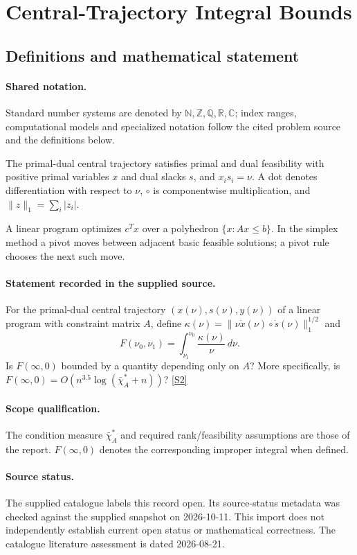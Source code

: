 \documentclass[11pt]{article}
\newcommand{\sref}[2]{\hyperlink{source:#1:#2}{[S#2]}}
\begin{document}
\section{Central-Trajectory Integral Bounds}\label{statement}

\subsection{Definitions and mathematical statement}

\paragraph{Shared notation.}Standard number systems are denoted by $\mathbb N,\mathbb Z,\mathbb Q,\mathbb R,\mathbb C$; index ranges, computational models and specialized notation follow the cited problem source and the definitions below.


The primal-dual central trajectory satisfies primal and dual feasibility with positive primal variables $x$ and dual slacks $s$, and $x_i s_i=\nu$. A dot denotes differentiation with respect to $\nu$, $\circ$ is componentwise multiplication, and $\lVert z\rVert_1=\sum_i|z_i|$.

A linear program optimizes $c^Tx$ over a polyhedron $\{x:Ax\leq b\}$. In the simplex method a pivot moves between adjacent basic feasible solutions; a pivot rule chooses the next such move.
\paragraph{Statement recorded in the supplied source.}
For the primal-dual central trajectory $(x(\nu),s(\nu),y(\nu))$ of a linear program with constraint matrix $A$, define $\kappa(\nu)=\lVert\nu\dot x(\nu)\circ\dot s(\nu)\rVert_1^{1/2}$ and $$F(\nu_0,\nu_1)=\int_{\nu_1}^{\nu_0}\frac{\kappa(\nu)}{\nu}\,d\nu.$$ Is $F(\infty,0)$ bounded by a quantity depending only on $A$? More specifically, is $F(\infty,0)=O\!\left(n^{3.5}\log(\bar\chi_A^*+n)\right)$? \sref{statement}{2}
\paragraph{Scope qualification.}
The condition measure $\bar\chi_A^*$ and required rank/feasibility assumptions are those of the report. $F(\infty,0)$ denotes the corresponding improper integral when defined.
\paragraph{Source status.}
The supplied catalogue labels this record open. Its source-status metadata was checked against the supplied snapshot on 2026-10-11. This import does not independently establish current open status or mathematical correctness. The catalogue literature assessment is dated 2026-08-21.
\end{document}
